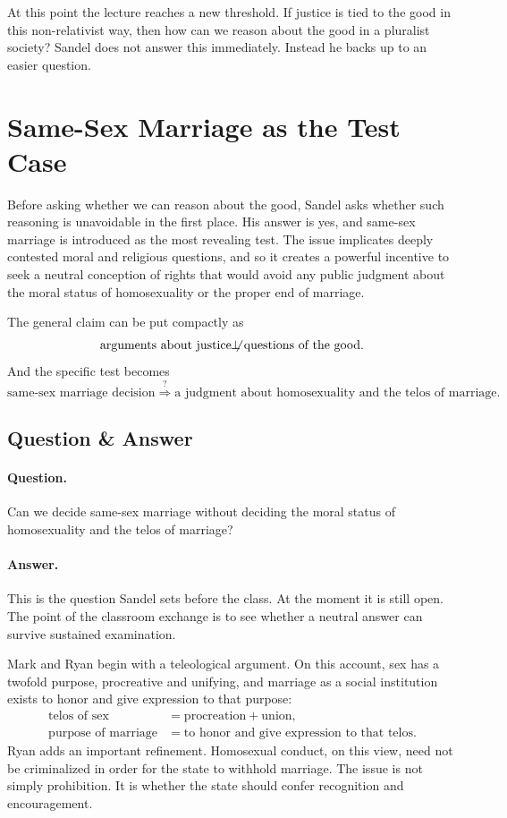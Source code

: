 At this point the lecture reaches a new threshold. If justice is tied to the good in this non-relativist way, then how can we reason about the good in a pluralist society? Sandel does not answer this immediately. Instead he backs up to an easier question.

\section{Same-Sex Marriage as the Test Case}

Before asking whether we can reason about the good, Sandel asks whether such reasoning is unavoidable in the first place. His answer is yes, and same-sex marriage is introduced as the most revealing test. The issue implicates deeply contested moral and religious questions, and so it creates a powerful incentive to seek a neutral conception of rights that would avoid any public judgment about the moral status of homosexuality or the proper end of marriage.

The general claim can be put compactly as
\begin{equation}
\text{arguments about justice}
\not\!\!\perp
\text{questions of the good}.
\end{equation}
And the specific test becomes
\begin{equation}
\text{same-sex marriage decision}
\stackrel{?}{\Longrightarrow}
\text{a judgment about homosexuality and the telos of marriage}.
\end{equation}

\subsection{Question \& Answer}

\paragraph{Question.} Can we decide same-sex marriage without deciding the moral status of homosexuality and the telos of marriage?

\paragraph{Answer.} This is the question Sandel sets before the class. At the moment it is still open. The point of the classroom exchange is to see whether a neutral answer can survive sustained examination.

Mark and Ryan begin with a teleological argument. On this account, sex has a twofold purpose, procreative and unifying, and marriage as a social institution exists to honor and give expression to that purpose:
\begin{align}
\text{telos of sex}
&=
\text{procreation} + \text{union},\\
\text{purpose of marriage}
&=
\text{to honor and give expression to that telos}.
\end{align}
Ryan adds an important refinement. Homosexual conduct, on this view, need not be criminalized in order for the state to withhold marriage. The issue is not simply prohibition. It is whether the state should confer recognition and encouragement.

